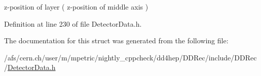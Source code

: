 z-\/position of layer ( z-\/position of middle axis ) 

Definition at line 230 of file DetectorData.h.

The documentation for this struct was generated from the following file:\begin{DoxyCompactItemize}
\item 
/afs/cern.ch/user/m/mpetric/nightly\_\-cppcheck/dd4hep/DDRec/include/DDRec/\hyperlink{_detector_data_8h}{DetectorData.h}\end{DoxyCompactItemize}
